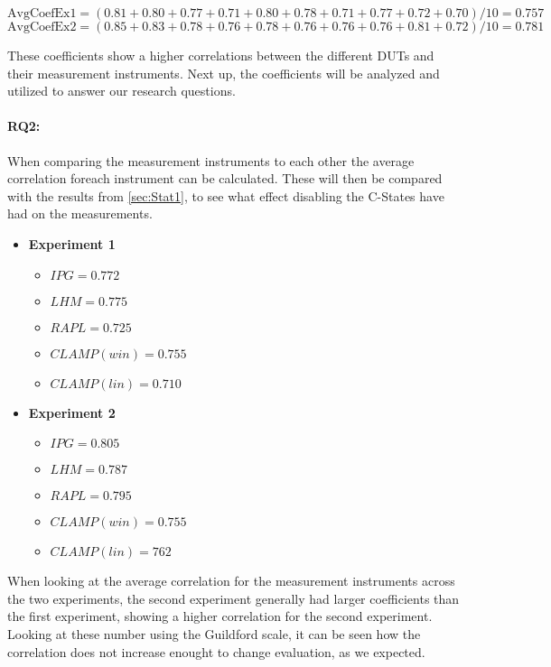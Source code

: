 $$\text{AvgCoefEx1} = (0.81+0.80+0.77+0.71+0.80+0.78+0.71+0.77+0.72+0.70)/10 = 0.757$$
$$\text{AvgCoefEx2} = (0.85+0.83+0.78+0.76+0.78+0.76+0.76+0.76+0.81+0.72)/10 = 0.781$$

These coefficients show a higher correlations between the different DUTs and their measurement instruments. Next up, the coefficients will be analyzed and utilized to answer our research questions. 

\paragraph{RQ2:} When comparing the measurement instruments to each other the average correlation foreach instrument can be calculated. These will then be compared with the results from \cref{sec:Stat1}, to see what effect disabling the C-States have had on the measurements.

\begin{itemize}
    \item \textbf{Experiment 1}
    \begin{itemize}
        \item $IPG = 0.772$ %
        \item $LHM = 0.775$ %
        \item $RAPL = 0.725$ %
        \item $CLAMP(win) = 0.755$ %
        \item $CLAMP(lin) = 0.710$ %
    \end{itemize}
    \item \textbf{Experiment 2}
    \begin{itemize}
        \item $IPG = 0.805$ %
        \item $LHM = 0.787$ %
        \item $RAPL = 0.795$%
        \item $CLAMP(win) = 0.755$ %
        \item $CLAMP(lin) = 762$ %
    \end{itemize}
\end{itemize}

When looking at the average correlation for the measurement instruments across the two experiments, the second experiment generally had larger coefficients than the first experiment, showing a higher correlation for the second experiment. Looking at these number using the Guildford scale, it can be seen how the correlation does not increase enought to change evaluation, as we expected.

